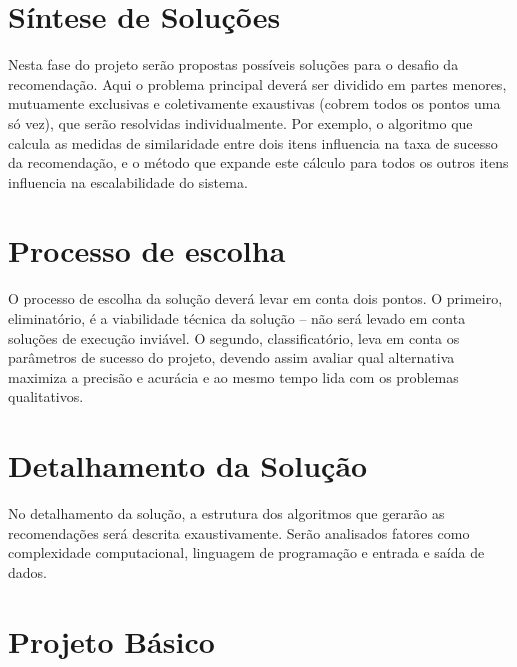 \section{Síntese de Soluções} %
\label{sec:s_ntese_de_solu_es}


Nesta fase do projeto serão propostas possíveis soluções para o desafio da recomendação. Aqui o problema principal deverá ser dividido em partes menores, mutuamente exclusivas e coletivamente exaustivas (cobrem todos os pontos uma só vez), que serão resolvidas individualmente. Por exemplo, o algoritmo que calcula as medidas de similaridade entre dois itens influencia na taxa de sucesso da recomendação, e o método que expande este cálculo para todos os outros itens influencia na escalabilidade do sistema.

\section{Processo de escolha} %
\label{sec:processo_de_escolha}


O processo de escolha da solução deverá levar em conta dois pontos. O primeiro, eliminatório, é a viabilidade técnica da solução -- não será levado em conta soluções de execução inviável. O segundo, classificatório, leva em conta os parâmetros de sucesso do projeto, devendo assim avaliar qual alternativa maximiza a precisão e acurácia e ao mesmo tempo lida com os problemas qualitativos.

\section{Detalhamento da Solução} %
\label{sec:detalhamento_da_solu_o}


No detalhamento da solução, a estrutura dos algoritmos que gerarão as recomendações será descrita exaustivamente. Serão analisados fatores como complexidade computacional, linguagem de programação e entrada e saída de dados.

\section{Projeto Básico} %
\label{sec:projeto_b_sico}


